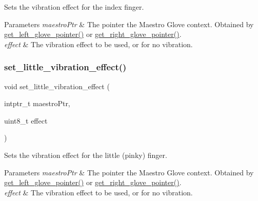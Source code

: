 Sets the vibration effect for the index finger. 
\begin{DoxyParams}{Parameters}
{\em maestro\+Ptr} & The pointer the Maestro Glove context. Obtained by \hyperlink{group__glove_management_ga63ce3c99d4a8b8db851b22af9185764e}{get\+\_\+left\+\_\+glove\+\_\+pointer()} or \hyperlink{group__glove_management_ga9b8fd9d91aeac3f8da50f7a7eba0c32b}{get\+\_\+right\+\_\+glove\+\_\+pointer()}. \\
\hline
{\em effect} & The vibration effect to be used, or {} for no vibration. \\
\hline
\end{DoxyParams}
\mbox{\label{group__vibration_control_gacfdcd1bab70eb2248b3e94c7653516f2}} 
\subsubsection{\texorpdfstring{set\+\_\+little\+\_\+vibration\+\_\+effect()}{set\_little\_vibration\_effect()}}
{\footnotesize\ttfamily void set\+\_\+little\+\_\+vibration\+\_\+effect (\begin{DoxyParamCaption}\item[{intptr\+\_\+t}]{maestro\+Ptr,  }\item[{uint8\+\_\+t}]{effect }\end{DoxyParamCaption})}

Sets the vibration effect for the little (pinky) finger. 
\begin{DoxyParams}{Parameters}
{\em maestro\+Ptr} & The pointer the Maestro Glove context. Obtained by \hyperlink{group__glove_management_ga63ce3c99d4a8b8db851b22af9185764e}{get\+\_\+left\+\_\+glove\+\_\+pointer()} or \hyperlink{group__glove_management_ga9b8fd9d91aeac3f8da50f7a7eba0c32b}{get\+\_\+right\+\_\+glove\+\_\+pointer()}. \\
\hline
{\em effect} & The vibration effect to be used, or {} for no vibration. \\
\hline
\end{DoxyParams}
\mbox{\label{group__vibration_control_gac5e818c55bae4cc053575cf56da645f6}} 
